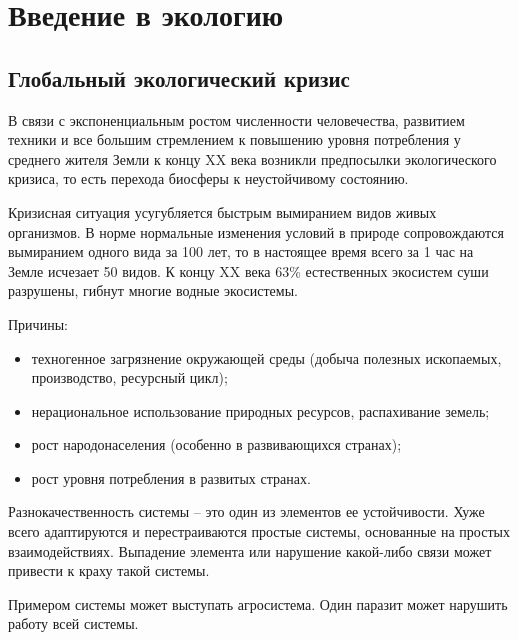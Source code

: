 \documentclass[a5paper, 11pt]{extarticle}
\author{Daniil Shvalov}
\date{\today}
\title{}
\theoremstyle{definition}
\theoremstyle{definition}
\theoremstyle{definition}
\numberwithin{figure}{section}
\begin{document}
\hypersetup{linktoc = all, colorlinks = true, urlcolor = DodgerBlue4, citecolor = PaleGreen1, linkcolor = black}
\tableofcontents
\hypersetup{linktoc = all, colorlinks = true, urlcolor = DodgerBlue4, citecolor = PaleGreen1, linkcolor = blue}
\newpage



\section{Введение в экологию}

\subsection{Глобальный экологический кризис}

В связи с экспоненциальным ростом численности человечества, развитием техники и все большим стремлением к повышению уровня потребления у среднего жителя Земли к концу XX века возникли предпосылки экологического кризиса, то есть перехода биосферы к неустойчивому состоянию.

Кризисная ситуация усугубляется быстрым вымиранием видов живых организмов. В норме нормальные изменения условий в природе сопровождаются вымиранием одного вида за 100 лет, то в настоящее время всего за 1 час на Земле исчезает 50 видов. К концу XX века 63\% естественных экосистем суши разрушены, гибнут многие водные экосистемы.

Причины:
\begin{itemize}
    \item техногенное загрязнение окружающей среды (добыча полезных ископаемых, производство, ресурсный цикл);
    \item нерациональное использование природных ресурсов, распахивание земель;
    \item рост народонаселения (особенно в развивающихся странах);
    \item рост уровня потребления в развитых странах.
\end{itemize}

Разнокачественность системы -- это один из элементов ее устойчивости. Хуже всего адаптируются и перестраиваются простые системы, основанные на простых взаимодействиях. Выпадение элемента или нарушение какой-либо связи может привести к краху такой системы.

Примером системы может выступать агросистема. Один паразит может нарушить работу всей системы.
\end{document}
